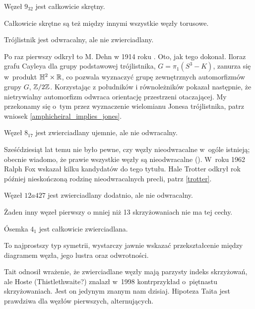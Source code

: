 \begin{example}
    Węzeł $9_{32}$ jest całkowicie skrętny.
\end{example}

Całkowicie skrętne są też między innymi wszystkie węzły torusowe.

\begin{example}
    \label{trefoil_is_chiral}
    Trójlistnik jest odwracalny, ale nie zwierciadlany.
\end{example}

Po raz pierwszy odkrył to M. Dehn w 1914 roku \cite{dehn14}.
Oto, jak tego dokonał.
Iloraz grafu Cayleya dla grupy podstawowej trójlistnika, $G = \pi_1(S^3 - K)$, zanurza się w~produkt $\mathbb H^2 \times \mathbb R$, co pozwala wyznaczyć grupę zewnętrznych automorfizmów grupy $G$, $\mathbb Z/2\mathbb Z$.
Korzystając z południków i równoleżników pokazał następnie, że nietrywialny automorfizm odwraca orientację przestrzeni otaczającej.
My przekonamy się o~tym przez wyznaczenie wielomianu Jonesa trójlistnika, patrz wniosek \ref{amphicheiral_implies_jones}.

\begin{example}
    Węzeł $8_{17}$ jest zwierciadlany ujemnie, ale nie odwracalny.
\end{example}

Sześćdziesiąt lat temu nie było pewne, czy węzły nieodwracalne w~ogóle istnieją; obecnie wiadomo, że prawie wszystkie węzły są nieodwracalne (\cite[s.~46]{murasugi96}).
W~roku 1962 Ralph Fox wskazał kilku kandydatów do tego tytułu.
Hale Trotter odkrył rok później nieskończoną rodzinę nieodwracalnych precli, patrz \ref{trotter}.

\begin{example}
    Węzeł $12a427$ jest zwierciadlany dodatnio, ale nie odwracalny.
\end{example}

Żaden inny węzeł pierwszy o mniej niż 13 skrzyżowaniach nie ma tej cechy.

\begin{example}
    Ósemka $4_1$ jest całkowicie zwierciadlana.
\end{example}

To najprostszy typ symetrii, wystarczy jawnie wskazać przekształcenie między diagramem węzła, jego lustra oraz odwrotności.

Tait odnosił wrażenie, że zwierciadlane węzły mają parzysty indeks skrzyżowań,
ale Hoste (Thistlethwaite?) znalazł w~1998 kontrprzykład o~piętnastu skrzyżowaniach.
Jest on jedynym znanym nam dzisiaj.
Hipoteza Taita jest prawdziwa dla węzłów pierwszych, alternujących.

